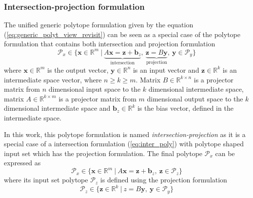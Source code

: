 \subsubsection{Intersection-projection formulation}
\label{ch:inter_proj_form}

The unified generic polytope formulation given by the equation (\ref{eq:generic_polyt_view_revisit}) can be seen as a special case of the polytope formulation that contains both intersection and projection formulation
\begin{equation}
    \mathcal{P}_x \in \{\bm{x}\in \mathbb{R}^m~|~\underbrace{A \bm{x}= \bm{z}+ \bm{b}_z}_{\text{intersection}},~ \underbrace{ \bm{z}=B \bm{y}}_{\text{projection}} ,~ \bm{y} \in \mathcal{P}_y\} 
    \label{eq:inter_proj_poly}
\end{equation}
where $\bm{x}\in\mathbb{R}^m$ is the output vector, $\bm{y} \in \mathbb{R}^n$ is an input vector and $\bm{z}\in\mathbb{R}^k$ is an intermediate space vector, where $n\!\geq\!k\!\geq\!m$. Matrix $B\in \mathbb{R}^{k \times n}$ is a projector matrix from $n$ dimensional input space to the $k$ dimensional intermediate space, matrix $A\in \mathbb{R}^{k\times m}$ is a projector matrix from $m$ dimensional output space to the $k$ dimensional intermediate space and $\bm{b}_z\in\mathbb{R}^k$ is the bias vector, defined in the intermediate space.

In this work, this polytope formulation is named \textit{intersection-projection} as it is a special case of a intersection formulation (\ref{eq:inter_poly}) with polytope shaped input set which has the projection formulation. The final polytope $\mathcal{P}_x$ can be expressed as
\begin{equation}
    \mathcal{P}_x \in \{\bm{x}\in \mathbb{R}^m~|~A \bm{x} = \bm{z} + \bm{b}_z,~ \bm{z} \in \mathcal{P}_z\} 
\end{equation}
where its input set polytope $\mathcal{P}_z$ is defined using the projection formulation
\begin{equation}
    \mathcal{P}_z \in \{\bm{z}\in \mathbb{R}^k~|~z = B\bm{y},~ \bm{y} \in \mathcal{P}_y\} 
\end{equation}

